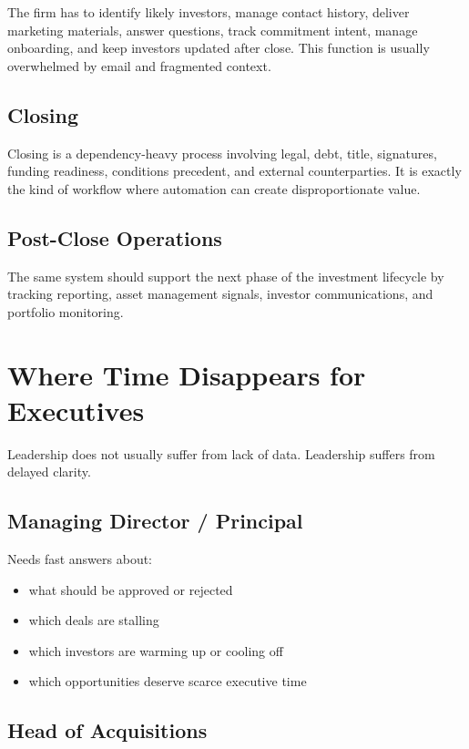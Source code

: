 \documentclass[11pt]{article}
\begin{document}
The firm has to identify likely investors, manage contact history, deliver marketing materials, answer questions, track commitment intent, manage onboarding, and keep investors updated after close. This function is usually overwhelmed by email and fragmented context.

\subsection{Closing}

Closing is a dependency-heavy process involving legal, debt, title, signatures, funding readiness, conditions precedent, and external counterparties. It is exactly the kind of workflow where automation can create disproportionate value.

\subsection{Post-Close Operations}

The same system should support the next phase of the investment lifecycle by tracking reporting, asset management signals, investor communications, and portfolio monitoring.

\section{Where Time Disappears for Executives}

Leadership does not usually suffer from lack of data. Leadership suffers from delayed clarity.

\subsection{Managing Director / Principal}

Needs fast answers about:

\begin{itemize}
\item what should be approved or rejected
\item which deals are stalling
\item which investors are warming up or cooling off
\item which opportunities deserve scarce executive time
\end{itemize}

\subsection{Head of Acquisitions}
\end{document}
